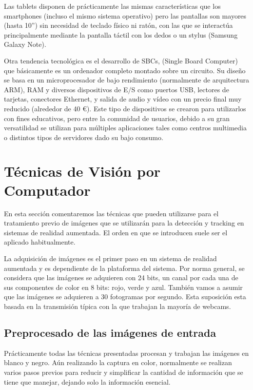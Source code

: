 Las tablets disponen de prácticamente las mismas características que los smartphones (incluso el mismo sistema operativo) pero las pantallas son mayores (hasta 10”) sin necesidad de teclado físico ni ratón, con las que se interactúa principalmente mediante la pantalla táctil con los dedos o un stylus (Samsung Galaxy Note).

Otra tendencia tecnológica es el desarrollo de SBCs, (Single Board Computer) que básicamente es un ordenador completo montado sobre un circuito. Su diseño se basa en un microprocesador de bajo rendimiento (normalmente de arquitectura ARM), RAM y diversos dispositivos de E/S como puertos USB, lectores de tarjetas, conectores Ethernet, y salida de audio y vídeo con un precio final muy reducido (alrededor de 40 \euro). Este tipo de dispositivos se crearon para utilizarlos con fines educativos, pero entre la comunidad de usuarios, debido a su gran versatilidad se utilizan para múltiples aplicaciones tales como centros multimedia o distintos tipos de servidores dado su bajo consumo.  

\section{Técnicas de Visión por Computador}
En esta sección comentaremos las técnicas que pueden utilizarse para el tratamiento previo de imágenes que se utilizarán para la detección y tracking en sistemas de realidad aumentada. El orden en que se introducen suele ser el aplicado  habitualmente.

La adquisición de imágenes es el primer paso en un sistema de realidad aumentada y es dependiente de la plataforma del sistema. Por norma general, se considera que las imágenes se adquieren con 24 bits, un canal por cada una de sus componentes de color en 8 bits: rojo, verde y azul. También vamos a asumir que las imágenes se adquieren a 30 fotogramas por segundo. Esta suposición esta basada en la transmisión típica con la que trabajan la mayoría de webcams.

\subsection{Preprocesado de las imágenes de entrada}
Prácticamente todas las técnicas presentadas procesan y trabajan las imágenes en blanco y negro. Aún realizando la captura en color, normalmente se realizan varios pasos previos para reducir y simplificar la cantidad de información que se tiene que manejar, dejando solo la información esencial.

